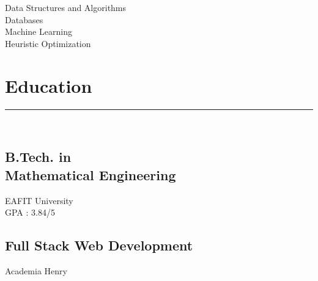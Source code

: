 \documentclass[]{rahulworld-resume}
\begin{document}
\begin{minipage}[t]{0.33\textwidth}
Data Structures and Algorithms\\
Databases\\
Machine Learning\\
Heuristic Optimization\\
\sectionsep
\section{Education}
\noindent\rule{3cm}{0.4pt}\\
\subsection{B.Tech. in \\
Mathematical Engineering}
EAFIT University \\
GPA : 3.84/5\\

\subsection{Full Stack Web Development}
Academia Henry

%
%

\end{minipage}
\hfill
\end{document}
